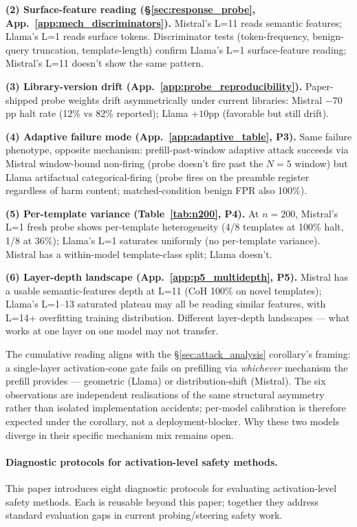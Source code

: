 \documentclass{article}
\begin{document}
\textbf{(2) Surface-feature reading (\S\ref{sec:response_probe}, App.~\ref{app:mech_discriminators}).} Mistral's L=11 reads semantic features; Llama's L=1 reads surface tokens. Discriminator tests (token-frequency, benign-query truncation, template-length) confirm Llama's L=1 surface-feature reading; Mistral's L=11 doesn't show the same pattern.

\textbf{(3) Library-version drift (App.~\ref{app:probe_reproducibility}).} Paper-shipped probe weights drift asymmetrically under current libraries: Mistral $-70$pp halt rate (12\% vs 82\% reported); Llama $+10$pp (favorable but still drift).

\textbf{(4) Adaptive failure mode (App.~\ref{app:adaptive_table}, P3).} Same failure phenotype, opposite mechanism: prefill-past-window adaptive attack succeeds via Mistral window-bound non-firing (probe doesn't fire past the $N=5$ window) but Llama artifactual categorical-firing (probe fires on the preamble register regardless of harm content; matched-condition benign FPR also 100\%).

\textbf{(5) Per-template variance (Table~\ref{tab:n200}, P4).} At $n=200$, Mistral's L=1 fresh probe shows per-template heterogeneity (4/8 templates at 100\% halt, 1/8 at 36\%); Llama's L=1 saturates uniformly (no per-template variance). Mistral has a within-model template-class split; Llama doesn't.

\textbf{(6) Layer-depth landscape (App.~\ref{app:p5_multidepth}, P5).} Mistral has a usable semantic-features depth at L=11 (CoH 100\% on novel templates); Llama's L=1--13 saturated plateau may all be reading similar features, with L=14+ overfitting training distribution. Different layer-depth landscapes — what works at one layer on one model may not transfer.

The cumulative reading aligns with the \S\ref{sec:attack_analysis} corollary's framing: a single-layer activation-cone gate fails on prefilling via \emph{whichever} mechanism the prefill provides --- geometric (Llama) or distribution-shift (Mistral). The six observations are independent realisations of the same structural asymmetry rather than isolated implementation accidents; per-model calibration is therefore expected under the corollary, not a deployment-blocker. Why these two models diverge in their specific mechanism mix remains open.

\paragraph{Diagnostic protocols for activation-level safety methods.}
\label{app:diagnostic_protocols}
This paper introduces eight diagnostic protocols for evaluating activation-level safety methods. Each is reusable beyond this paper; together they address standard evaluation gaps in current probing/steering safety work.
\end{document}
